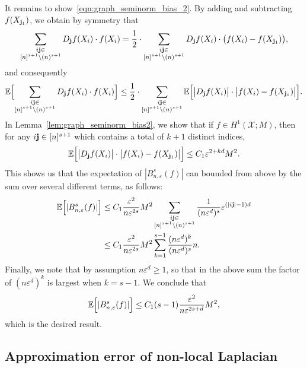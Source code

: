 \documentclass[aos]{imsart}
\theoremstyle{plain}
\theoremstyle{definition}
\theoremstyle{remark}
\newcommand{\Ebb}{\mathbb{E}}
\newcommand{\mc}[1]{\mathcal{#1}}
\newcommand{\1}{\mathbf{1}}
\newcommand{\bj}{{\bf j}}
\begin{document}
It remains to show~\eqref{eqn:graph_seminorm_bias_2}. By adding and subtracting $f(X_{\bj_1})$, we obtain by symmetry that
\begin{equation*}
\sum_{\substack{i\bj \in \\ [n]^{s + 1}\setminus (n)^{s + 1}}} D_{\bj}f(X_i) \cdot f(X_i) = \frac{1}{2} \cdot \sum_{\substack{i\bj \in \\ [n]^{s + 1}\setminus (n)^{s + 1}}} D_{\bj}f(X_i) \cdot \bigl(f(X_i) - f(X_{\bj_1})\bigr),
\end{equation*}
and consequently
\begin{equation*}
\Ebb\Bigl[\sum_{\substack{i\bj \in \\ [n]^{s + 1}\setminus (n)^{s + 1}}} D_{\bj}f(X_i) \cdot f(X_i)\Bigr] \leq \frac{1}{2} \cdot \sum_{\substack{i\bj \in \\ [n]^{s + 1}\setminus (n)^{s + 1}}} \Ebb\Bigl[\bigl|D_{\bj}f(X_i)\bigr| \cdot \bigl|f(X_i) - f(X_{\bj_1})\bigr|\Bigr].
\end{equation*}
In Lemma~\ref{lem:graph_seminorm_bias2}, we show that if $f \in H^1(\mc{X};M)$, then for any $i\bj \in [n]^{s + 1}$ which contains a total of $k + 1$ distinct indices, 
\begin{equation*}
\Ebb\Bigl[\bigl|D_{\bj}f(X_i)\bigr| \cdot \bigl|f(X_i) - f(X_{\bj_1})\bigr|\Bigr] \leq C_1 \varepsilon^{2 + kd} M^2.
\end{equation*}
This shows us that the expectation of $|B_{n,\varepsilon}^s(f)|$ can bounded from above by the sum over several different terms, as follows:
\begin{align*}
\Ebb\Bigl[|B_{n,\varepsilon}^s(f)|\Bigr] & \leq C_1\frac{\varepsilon^2}{n\varepsilon^{2s}}M^2 \sum_{\substack{i\bj \in \\ [n]^{s + 1}\setminus (n)^{s + 1}}} \frac{1}{(n\varepsilon^d)^s}  \varepsilon^{(|i\bj| - 1)d} \\
& \leq C_1\frac{\varepsilon^2}{n\varepsilon^{2s}}M^2  \sum_{k = 1}^{s - 1} \frac{(n\varepsilon^d)^k}{(n\varepsilon^d)^s}n.
\end{align*}
Finally, we note that by assumption $n\varepsilon^d \geq 1$, so that in the above sum the factor of $(n\varepsilon^d)^k$ is largest when $k = s- 1$. We conclude that
\begin{equation*}
\Ebb\Bigl[|B_{n,\varepsilon}^s(f)|\Bigr] \leq C_1 (s - 1) \frac{\varepsilon^2}{n\varepsilon^{2s + d}}M^2,
\end{equation*}
which is the desired result.

\subsection{Approximation error of non-local Laplacian}
\label{subsec:approximation_error_nonlocal_laplacian}
\end{document}
